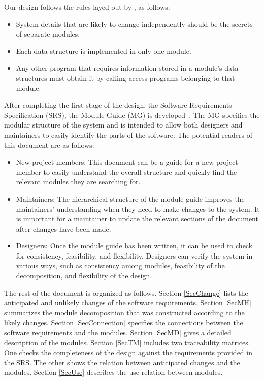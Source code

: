 \documentclass[12pt, titlepage]{article}
\begin{document}
Our design follows the rules layed out by \citet{ParnasEtAl1984}, as follows:
\begin{itemize}
\item System details that are likely to change independently should be the
  secrets of separate modules.
\item Each data structure is implemented in only one module.
\item Any other program that requires information stored in a module's data
  structures must obtain it by calling access programs belonging to that module.
\end{itemize}

After completing the first stage of the design, the Software Requirements
Specification (SRS), the Module Guide (MG) is developed~\citep{ParnasEtAl1984}. The MG
specifies the modular structure of the system and is intended to allow both
designers and maintainers to easily identify the parts of the software.  The
potential readers of this document are as follows:

\begin{itemize}
\item New project members: This document can be a guide for a new project member
  to easily understand the overall structure and quickly find the
  relevant modules they are searching for.
\item Maintainers: The hierarchical structure of the module guide improves the
  maintainers' understanding when they need to make changes to the system. It is
  important for a maintainer to update the relevant sections of the document
  after changes have been made.
\item Designers: Once the module guide has been written, it can be used to
  check for consistency, feasibility, and flexibility. Designers can verify the
  system in various ways, such as consistency among modules, feasibility of the
  decomposition, and flexibility of the design.
\end{itemize}

The rest of the document is organized as follows. Section
\ref{SecChange} lists the anticipated and unlikely changes of the software
requirements. Section \ref{SecMH} summarizes the module decomposition that
was constructed according to the likely changes. Section \ref{SecConnection}
specifies the connections between the software requirements and the
modules. Section \ref{SecMD} gives a detailed description of the
modules. Section \ref{SecTM} includes two traceability matrices. One checks
the completeness of the design against the requirements provided in the SRS. The
other shows the relation between anticipated changes and the modules. Section
\ref{SecUse} describes the use relation between modules.
\end{document}
